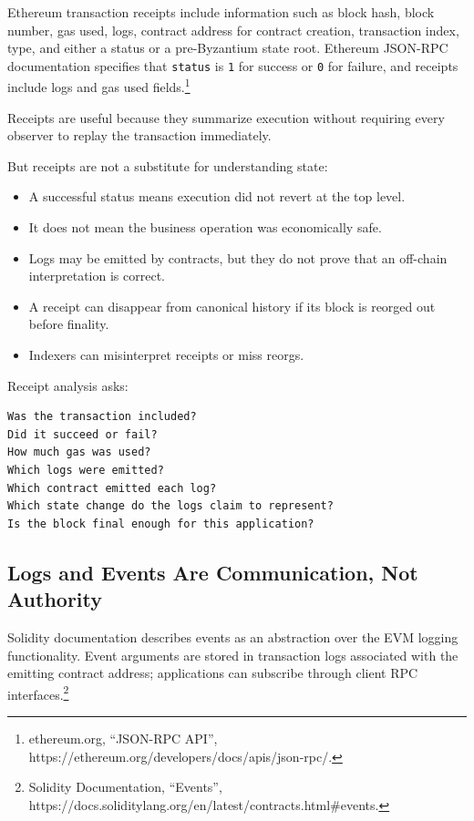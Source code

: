 Ethereum transaction receipts include information such as block hash,
block number, gas used, logs, contract address for contract creation,
transaction index, type, and either a status or a pre-Byzantium state
root. Ethereum JSON-RPC documentation specifies that
\passthrough{\lstinline!status!} is \passthrough{\lstinline!1!} for
success or \passthrough{\lstinline!0!} for failure, and receipts include
logs and gas used fields.\footnote{ethereum.org, ``JSON-RPC API'',
  https://ethereum.org/developers/docs/apis/json-rpc/.}

Receipts are useful because they summarize execution without requiring
every observer to replay the transaction immediately.

But receipts are not a substitute for understanding state:

\begin{itemize}
\tightlist
\item
  A successful status means execution did not revert at the top level.
\item
  It does not mean the business operation was economically safe.
\item
  Logs may be emitted by contracts, but they do not prove that an
  off-chain interpretation is correct.
\item
  A receipt can disappear from canonical history if its block is reorged
  out before finality.
\item
  Indexers can misinterpret receipts or miss reorgs.
\end{itemize}

Receipt analysis asks:

\begin{lstlisting}
Was the transaction included?
Did it succeed or fail?
How much gas was used?
Which logs were emitted?
Which contract emitted each log?
Which state change do the logs claim to represent?
Is the block final enough for this application?
\end{lstlisting}

\subsection{Logs and Events Are Communication, Not Authority}

Solidity documentation describes events as an abstraction over the EVM
logging functionality. Event arguments are stored in transaction logs
associated with the emitting contract address; applications can
subscribe through client RPC interfaces.\footnote{Solidity
  Documentation, ``Events'',
  https://docs.soliditylang.org/en/latest/contracts.html\#events.}

